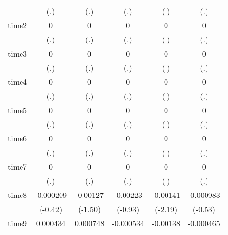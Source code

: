 \begin{table}[htbp]
\begin{tabular}{l*{5}{c}}
            &         (.)         &         (.)         &         (.)         &         (.)         &         (.)         \\
time2       &           0         &           0         &           0         &           0         &           0         \\
            &         (.)         &         (.)         &         (.)         &         (.)         &         (.)         \\
time3       &           0         &           0         &           0         &           0         &           0         \\
            &         (.)         &         (.)         &         (.)         &         (.)         &         (.)         \\
time4       &           0         &           0         &           0         &           0         &           0         \\
            &         (.)         &         (.)         &         (.)         &         (.)         &         (.)         \\
time5       &           0         &           0         &           0         &           0         &           0         \\
            &         (.)         &         (.)         &         (.)         &         (.)         &         (.)         \\
time6       &           0         &           0         &           0         &           0         &           0         \\
            &         (.)         &         (.)         &         (.)         &         (.)         &         (.)         \\
time7       &           0         &           0         &           0         &           0         &           0         \\
            &         (.)         &         (.)         &         (.)         &         (.)         &         (.)         \\
time8       &   -0.000209         &    -0.00127         &    -0.00223         &    -0.00141\sym{*}  &   -0.000983         \\
            &     (-0.42)         &     (-1.50)         &     (-0.93)         &     (-2.19)         &     (-0.53)         \\
time9       &    0.000434         &    0.000748         &   -0.000534         &    -0.00138\sym{**} &   -0.000465         \\

\end{tabular}
\end{table}
